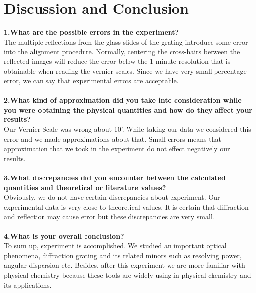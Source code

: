 \documentclass[a4paper,12pt]{report}
\begin{document}
\chapter{Discussion and Conclusion}
\textbf{1.What are the possible errors in the experiment?}\\
The multiple reflections from the glass slides of the grating
introduce some error into the alignment procedure.
Normally, centering the cross-hairs between the reflected
images will reduce the error below the 1-minute resolution
that is obtainable when reading the vernier scales. Since we have very small percentage error, we can say that experimental errors are acceptable.\\\\
\textbf{2.What kind of approximation did you take into consideration while you were obtaining the physical quantities and how do they affect your results?}\\
Our Vernier Scale was wrong about 10'. While taking our data we considered this error and we made approximations about that. Small errors means that approximation that we took in the experiment do not effect negatively our results.\\\\
\textbf{3.What discrepancies did you encounter between the calculated quantities and theoretical or literature values?}\\
Obviously, we do not have certain discrepancies about experiment. Our experimental data is very close to theoretical values. It is certain that diffraction and reflection may cause error but these discrepancies are very small.\\\\ 
\textbf{4.What is your overall conclusion?}\\
To sum up, experiment is accomplished. We studied an important optical phenomena, diffraction grating and its related minors such as resolving power, angular dispersion etc. Besides, after this experiment we are more familiar with physical chemistry because these tools are widely using in physical chemistry and its applications.  
\end{document}
